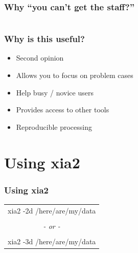 \documentclass[slides,compress]{beamer}
\begin{document}
\begin{frame}
\frametitle{Why ``you can't get the staff?''}
\begin{columns}
\end{columns}
\end{frame}

\begin{frame}
\frametitle{Why is this useful?}
\begin{itemize}
\item{Second opinion}
\item{Allows you to focus on problem cases}
\item{Help  busy / novice users}
\item{Provides access to other tools}
\item{Reproducible processing}
\end{itemize}
\end{frame}

\section{Using xia2}

\begin{frame}
\frametitle{Using xia2}
\begin{center}
\begin{tabular}{c}
{\huge
xia2 -2d /here/are/my/data
}\\
\\
{\huge \emph{- or -}} \\
\\
{\huge
xia2 -3d /here/are/my/data
}\\
\end{tabular}
\end{center}
\end{frame}
\end{document}
